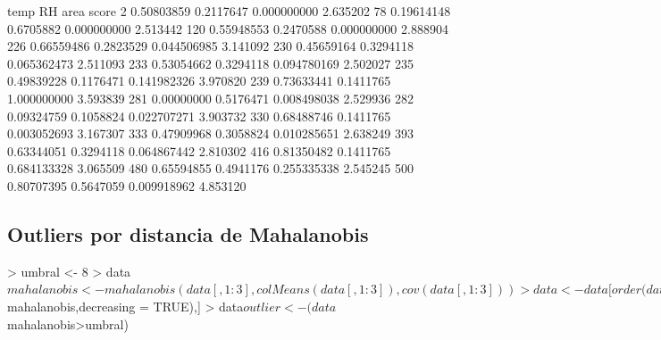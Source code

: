 \documentclass [a4paper] {article}
\begin{document}
\begin{center}
\begin{Schunk}
\begin{Soutput}
          temp        RH        area    score
2   0.50803859 0.2117647 0.000000000 2.635202
78  0.19614148 0.6705882 0.000000000 2.513442
120 0.55948553 0.2470588 0.000000000 2.888904
226 0.66559486 0.2823529 0.044506985 3.141092
230 0.45659164 0.3294118 0.065362473 2.511093
233 0.53054662 0.3294118 0.094780169 2.502027
235 0.49839228 0.1176471 0.141982326 3.970820
239 0.73633441 0.1411765 1.000000000 3.593839
281 0.00000000 0.5176471 0.008498038 2.529936
282 0.09324759 0.1058824 0.022707271 3.903732
330 0.68488746 0.1411765 0.003052693 3.167307
333 0.47909968 0.3058824 0.010285651 2.638249
393 0.63344051 0.3294118 0.064867442 2.810302
416 0.81350482 0.1411765 0.684133328 3.065509
480 0.65594855 0.4941176 0.255335338 2.545245
500 0.80707395 0.5647059 0.009918962 4.853120
\end{Soutput}
\end{Schunk}
\end{center}

\newpage
\subsection{Outliers por distancia de Mahalanobis}


\begin{Schunk}
\begin{Sinput}
> umbral <- 8
> data$mahalanobis <- mahalanobis(data[,1:3], colMeans(data[,1:3]), cov(data[,1:3]))
> data <- data[order(data$mahalanobis,decreasing = TRUE),]
> data$outlier <- (data$mahalanobis>umbral)
\end{Sinput}
\end{Schunk}
\end{document}

